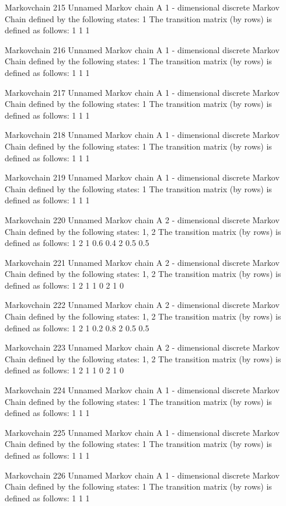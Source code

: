 \documentclass[
  nojss]{jss}
\begin{document}
\begin{CodeChunk}
\begin{CodeOutput}
Markovchain  215 
Unnamed Markov chain 
 A  1 - dimensional discrete Markov Chain defined by the following states: 
 1 
 The transition matrix  (by rows)  is defined as follows: 
  1
1 1

Markovchain  216 
Unnamed Markov chain 
 A  1 - dimensional discrete Markov Chain defined by the following states: 
 1 
 The transition matrix  (by rows)  is defined as follows: 
  1
1 1

Markovchain  217 
Unnamed Markov chain 
 A  1 - dimensional discrete Markov Chain defined by the following states: 
 1 
 The transition matrix  (by rows)  is defined as follows: 
  1
1 1

Markovchain  218 
Unnamed Markov chain 
 A  1 - dimensional discrete Markov Chain defined by the following states: 
 1 
 The transition matrix  (by rows)  is defined as follows: 
  1
1 1

Markovchain  219 
Unnamed Markov chain 
 A  1 - dimensional discrete Markov Chain defined by the following states: 
 1 
 The transition matrix  (by rows)  is defined as follows: 
  1
1 1

Markovchain  220 
Unnamed Markov chain 
 A  2 - dimensional discrete Markov Chain defined by the following states: 
 1, 2 
 The transition matrix  (by rows)  is defined as follows: 
    1   2
1 0.6 0.4
2 0.5 0.5

Markovchain  221 
Unnamed Markov chain 
 A  2 - dimensional discrete Markov Chain defined by the following states: 
 1, 2 
 The transition matrix  (by rows)  is defined as follows: 
  1 2
1 1 0
2 1 0

Markovchain  222 
Unnamed Markov chain 
 A  2 - dimensional discrete Markov Chain defined by the following states: 
 1, 2 
 The transition matrix  (by rows)  is defined as follows: 
    1   2
1 0.2 0.8
2 0.5 0.5

Markovchain  223 
Unnamed Markov chain 
 A  2 - dimensional discrete Markov Chain defined by the following states: 
 1, 2 
 The transition matrix  (by rows)  is defined as follows: 
  1 2
1 1 0
2 1 0

Markovchain  224 
Unnamed Markov chain 
 A  1 - dimensional discrete Markov Chain defined by the following states: 
 1 
 The transition matrix  (by rows)  is defined as follows: 
  1
1 1

Markovchain  225 
Unnamed Markov chain 
 A  1 - dimensional discrete Markov Chain defined by the following states: 
 1 
 The transition matrix  (by rows)  is defined as follows: 
  1
1 1

Markovchain  226 
Unnamed Markov chain 
 A  1 - dimensional discrete Markov Chain defined by the following states: 
 1 
 The transition matrix  (by rows)  is defined as follows: 
  1
1 1


\end{CodeOutput}
\end{CodeChunk}
\end{document}
